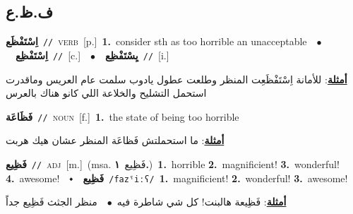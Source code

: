 \documentclass[10pt,a4paper,twoside]{article} %
\begin{document}
\begin{multicols}{2}
\vspace{-3mm}
\subsection*{\color{blue}\foreignlanguage{arabic}{ف.ظ.ع}\color{blue}{}} 

{\setlength\topsep{0pt}\textbf{\foreignlanguage{arabic}{اِسْتَفْظَع}}\ {\color{gray}\texttt{//}\color{black}}\ \textsc{verb}\ [p.]\ \textbf{1.}~consider sth as too horrible an unacceptable\ \ $\bullet$\ \ \setlength\topsep{0pt}\textbf{\foreignlanguage{arabic}{اِسْتَفْظِع}}\ {\color{gray}\texttt{//}\color{black}}\ [c.]\ \ $\bullet$\ \ \setlength\topsep{0pt}\textbf{\foreignlanguage{arabic}{يِسْتَفْظِع}}\ {\color{gray}\texttt{//}\color{black}}\ [i.]\  \begin{flushright}\color{gray}\foreignlanguage{arabic}{\textbf{\underline{\foreignlanguage{arabic}{أمثلة}}}: للأمانة اِسْتَفْظَعِت المنظر وطلعت عطول يادوب سلمت عام العريس وماقدرت استحمل التشليح والخلاعة اللي كانو هناك بالعرس}\end{flushright}\color{black}} \vspace{2mm}

{\setlength\topsep{0pt}\textbf{\foreignlanguage{arabic}{فَظَاعَة}}\ {\color{gray}\texttt{//}\color{black}}\ \textsc{noun}\ [f.]\ \textbf{1.}~the state of being too horrible\  \begin{flushright}\color{gray}\foreignlanguage{arabic}{\textbf{\underline{\foreignlanguage{arabic}{أمثلة}}}: ما استحملتش فَظاعَة المنظر عشان هيك هربت}\end{flushright}\color{black}} \vspace{2mm}

{\setlength\topsep{0pt}\textbf{\foreignlanguage{arabic}{فَظِيع}}\ {\color{gray}\texttt{//}\color{black}}\ \textsc{adj}\ [m.]\ \color{gray}(msa. \foreignlanguage{arabic}{فَظِيع}~\foreignlanguage{arabic}{\textbf{١.}})\color{black}\ \textbf{1.}~horrible  \textbf{2.}~magnificient!  \textbf{3.}~wonderful!  \textbf{4.}~awesome!\ \ $\smblkdiamond$\ \ \setlength\topsep{0pt}\textbf{\foreignlanguage{arabic}{فَظِيع}}\ {\color{gray}\texttt{/fazˤiːʕ/}\color{black}}\ \textbf{1.}~magnificient!  \textbf{2.}~wonderful!  \textbf{3.}~awesome!\  \begin{flushright}\color{gray}\foreignlanguage{arabic}{\textbf{\underline{\foreignlanguage{arabic}{أمثلة}}}: فَظِيعة هالبنت! كل شي شاطرة فيه\ $\bullet$\ \  منظر الجثث فَظِيع جداً}\end{flushright}\color{black}} \vspace{2mm}


\end{multicols}
\end{document}
